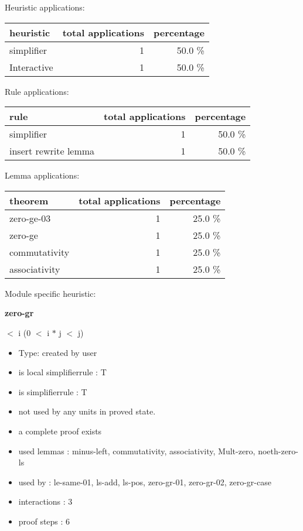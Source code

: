 \documentclass[a4paper]{article}
\begin{document}
\medskip


Heuristic applications:

\begin{supertabular}{l|r|r}
heuristic	& total applications & percentage \\ \hline
simplifier & 1 & 50.0 \% \\
Interactive & 1 & 50.0 \% \\

\end{supertabular}

Rule applications:

\begin{supertabular}{l|r|r}
rule	        & total applications & percentage \\ \hline
simplifier & 1 & 50.0 \% \\
insert rewrite lemma & 1 & 50.0 \% \\

\end{supertabular}

Lemma applications:

\begin{supertabular}{l|r|r}
theorem	        & total applications & percentage \\ \hline
zero-ge-03 & 1 & 25.0 \% \\
zero-ge & 1 & 25.0 \% \\
commutativity & 1 & 25.0 \% \\
associativity & 1 & 25.0 \% \\

\end{supertabular}

Module specific heuristic:

\pagebreak

{\LARGE\bf zero-gr}\label{lemma-zero-gr}

\medskip

  $<$ i \Imp (0 $<$ i $*$ j  $<$ j)

\begin{itemize}

\item Type: created by user

\item is local simplifierrule : T
\item is simplifierrule : T
\item not used by any units in proved state.
\item       a complete proof exists
\item       used lemmas  : minus-left, commutativity, associativity, Mult-zero, noeth-zero-ls
\item       used by      : le-same-01, ls-add, ls-pos, zero-gr-01, zero-gr-02, zero-gr-case
\item       interactions : 3
\item       proof steps  : 6
\end{itemize}
\end{document}
